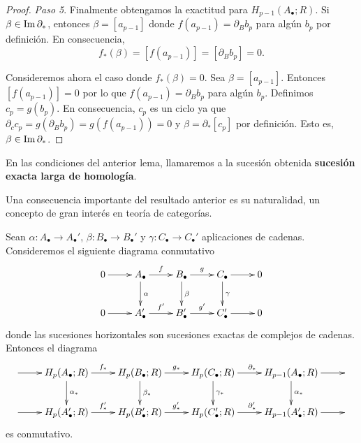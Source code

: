 \begin{proof}
	\textit{Paso 5}. Finalmente obtengamos la exactitud para
	\(H_{p-1}(A_{\bullet};R)\). Si \(\beta \in \operatorname{Im} \partial_{*}\), entonces
	\(\beta = [a_{p-1}]\) donde \(f(a_{p-1}) = \partial_{B}b_{p}\) para algún \(b_{p}\)
	por definición. En consecuencia,
	\[
	f_{*}(\beta) = [f(a_{p-1})] = [\partial_{B}b_{p}] = 0.
	\]
	
	Consideremos ahora el caso donde \(f_{*}(\beta) = 0\). Sea \(\beta = [a_{p-1}]\). Entonces
	\([f(a_{p-1})] = 0\) por lo que \(f(a_{p-1}) = \partial_{B}b_{p}\) para algún \(b_{p}\).
	Definimos \(c_{p}= g(b_{p})\). En consecuencia, \(c_{p}\) es un ciclo ya que
	\(\partial_{c}c_{p}= g(\partial_{B}b_{p}) = g(f(a_{p-1})) = 0\) y
	\(\beta = \partial_{*}[c_{p}]\) por definición. Esto es,
	\(\beta \in \operatorname{Im} \partial_{*}\).
\end{proof}
\begin{definicion}
	En las condiciones del anterior lema, llamaremos a la sucesión obtenida
	\textbf{sucesión exacta larga de homología}.
\end{definicion}
Una consecuencia importante del resultado anterior es su naturalidad, un concepto
de gran interés en teoría de categorías.
\begin{teorema}
	Sean \(\alpha : A_\bullet \to A_\bullet'\), \(\beta : B_\bullet \to B_\bullet'\) y \(\gamma : C_\bullet \to C_\bullet'\) aplicaciones de cadenas. Consideremos el siguiente diagrama conmutativo
	\[
	\xymatrix{ 0 \ar@{->}[r] & A_{\bullet} \ar@{->}[r]^{f} \ar@{->}[d]^{\alpha} & B_{\bullet} \ar@{->}[r]^{g} \ar@{->}[d]^{\beta} & C_{\bullet} \ar@{->}[r] \ar@{->}[d]^{\gamma} & 0 \\ 0 \ar@{->}[r] & A'_{\bullet} \ar@{->}[r]^{f'} & B'_{\bullet} \ar@{->}[r]^{g'} & C'_{\bullet} \ar@{->}[r] & 0 }
	\]
	donde las sucesiones horizontales son sucesiones exactas de complejos de cadenas.
	Entonces el diagrama
	\[
	\xymatrix{ {} \ar@{->}[r] & H_p(A_{\bullet};R) \ar@{->}[r]^{f_*} \ar@{->}[d]^{\alpha_*} & H_p(B_{\bullet};R) \ar@{->}[r]^{g_*} \ar@{->}[d]^{\beta_*} & H_p(C_{\bullet};R) \ar@{->}[r]^{\partial_*} \ar@{->}[d]^{\gamma_*} & H_{p-1}(A_{\bullet};R) \ar@{->}[r] \ar@{->}[d]^{\alpha_*} & {} \\ {} \ar@{->}[r] & H_p(A'_{\bullet};R) \ar@{->}[r]^{f'_*} & H_p(B'_{\bullet};R) \ar@{->}[r]^{g'_*} & H_p(C'_{\bullet};R) \ar@{->}[r]^{\partial'_*} & H_{p-1}(A'_{\bullet};R) \ar@{->}[r] & }
	\]
	es conmutativo.
\end{teorema}
